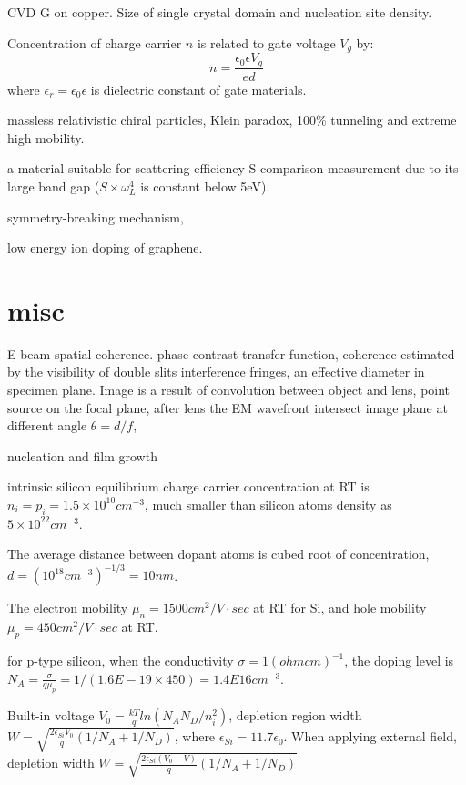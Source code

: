 CVD G on copper. Size of single crystal domain and nucleation site density.\cite{Wu2013b}

Concentration of charge carrier $n$ is related to gate voltage $V_g$ by:
\[
n = \frac{\epsilon_0 \epsilon V_g}{ed}
\]
where $\epsilon_r = \epsilon_0 \epsilon$ is dielectric constant of gate materials.

massless relativistic chiral particles, Klein paradox, 100\% tunneling and extreme high mobility.

 a material suitable for scattering efficiency S comparison measurement due to its large band gap ($S\times \omega_L^4$ is constant below 5eV).

symmetry-breaking mechanism,

low energy ion doping of graphene.\cite{Ahlgren2011}

\section{misc}

E-beam spatial coherence.\cite{Morishita2013} phase contrast transfer function, coherence estimated by the visibility of double slits interference fringes, an effective diameter in specimen plane.  Image is a result of convolution between object and lens, point source on the focal plane, after lens the EM wavefront intersect image plane at different angle $\theta = d/f$, 

nucleation and film growth \cite{Hanbucken1984}

intrinsic silicon equilibrium charge carrier concentration at RT is $n_i = p_i = 1.5 \times 10^{10} cm^{-3}$, much smaller than silicon atoms density as $5\times 10 ^{22} cm^{-3}$.

The average distance between dopant atoms is cubed root of concentration, $d = (10^{18} cm^{-3})^{-1/3} = 10nm$.

The electron mobility $\mu_n = 1500 cm^2/V\cdot sec $ at RT for Si, and hole mobility $\mu_p = 450 cm^2/V\cdot sec$ at RT.

for p-type silicon, when the conductivity $\sigma = 1 (ohm cm )^{-1}$, the doping level is
$N_A = \frac{\sigma}{q \mu_p}= 1 / (1.6E-19 \times 450) = 1.4E16 cm^{-3}$.

Built-in voltage $V_0 = \frac{kT}{q}ln(N_A N_D/n_i^2)$, depletion region width $W = \sqrt{\frac{2 \epsilon_{Si} V_0}{q}(1/N_A + 1/N_D)}$, where $\epsilon_{Si} = 11.7 \epsilon_0$. When applying external field, depletion width $W = \sqrt{\frac{2 \epsilon_{Si} (V_0 - V) }{q}(1/N_A + 1/N_D)}$

